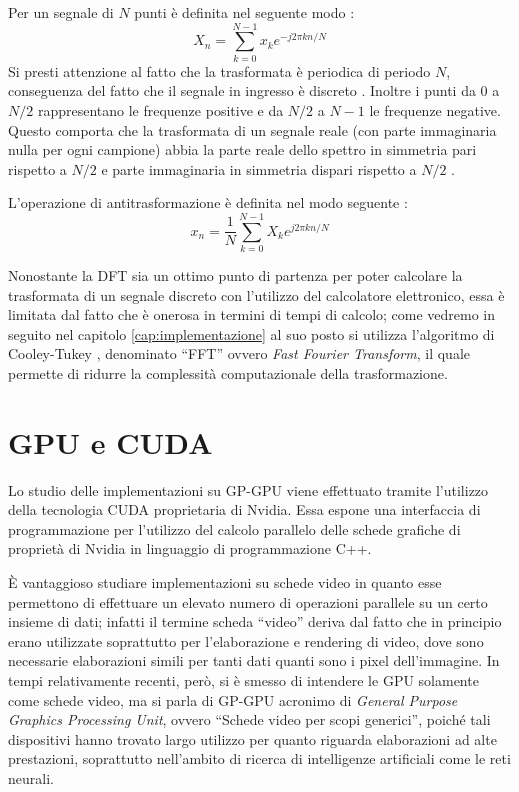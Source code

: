 Per un segnale di $N$ punti è definita nel seguente modo \cite[p.~2.50]{calandrino}:
\begin{equation}
    X_n = \displaystyle\sum_{k=0}^{N-1}x_k e^{-j 2\pi kn/N}
    \label{eq:dft}
\end{equation}
Si presti attenzione al fatto che la trasformata è periodica di periodo $N$, conseguenza del fatto che il segnale in ingresso è discreto \cite[p.~2.30]{calandrino}. Inoltre i punti da $0$ a $N/2$ rappresentano le frequenze positive e da $N/2$ a $N-1$ le frequenze negative. Questo comporta che la trasformata di un segnale reale (con parte immaginaria nulla per ogni campione) abbia la parte reale dello spettro in simmetria pari rispetto a $N/2$ e parte immaginaria in simmetria dispari rispetto a $N/2$ \cite[p.~570]{dspguide}.

L'operazione di antitrasformazione è definita nel modo seguente \cite[p.~2.50]{calandrino}:
\begin{equation}
    x_n = \frac{1}{N}\displaystyle\sum_{k=0}^{N-1}X_k e^{j 2\pi kn/N}
\end{equation}

Nonostante la DFT sia un ottimo punto di partenza per poter calcolare la trasformata di un segnale discreto con l'utilizzo del calcolatore elettronico, essa è limitata dal fatto che è onerosa in termini di tempi di calcolo; come vedremo in seguito nel capitolo \ref{cap:implementazione} al suo posto si utilizza l'algoritmo di Cooley-Tukey \cite{cooleytukey}, denominato ``FFT'' ovvero \textit{Fast Fourier Transform}, il quale permette di ridurre la complessità computazionale della trasformazione.

\section{GPU e CUDA}
Lo studio delle implementazioni su GP-GPU viene effettuato tramite l'utilizzo della tecnologia CUDA proprietaria di Nvidia. Essa espone una interfaccia di programmazione per l'utilizzo del calcolo parallelo delle schede grafiche di proprietà di Nvidia in linguaggio di programmazione C++.

È vantaggioso studiare implementazioni su schede video in quanto esse permettono di effettuare un elevato numero di operazioni parallele su un certo insieme di dati; infatti il termine scheda ``video'' deriva dal fatto che in principio erano utilizzate soprattutto per l'elaborazione e rendering di video, dove sono necessarie elaborazioni simili per tanti dati quanti sono i pixel dell'immagine. In tempi relativamente recenti, però, si è smesso di intendere le GPU solamente come schede video, ma si parla di GP-GPU acronimo di \textit{General Purpose Graphics Processing Unit}, ovvero ``Schede video per scopi generici'', poiché tali dispositivi hanno trovato largo utilizzo per quanto riguarda elaborazioni ad alte prestazioni, soprattutto nell'ambito di ricerca di intelligenze artificiali come le reti neurali.

